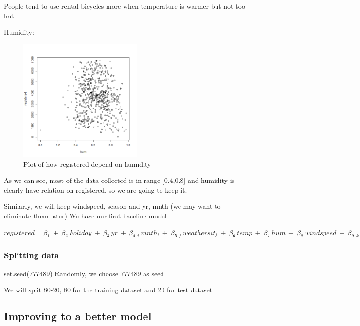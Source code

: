 People tend to use rental bicycles more when temperature is warmer but not too hot. 

Humidity:
\begin{figure}[H]
\centering
\includegraphics[width=0.55\textwidth]{img/plothum.png}
\caption{Plot of how registered depend on humidity}
\label{fig:humidity_on_registered_plot}
\end{figure}

As we can see, most of the data collected is in range [0.4,0.8] and humidity is clearly have relation on registered, so we are going to keep it.

Similarly, we will keep windspeed, season and yr, mnth (we may want to eliminate them later)
We have our first baseline model

\begin{center}
    $registered = \beta_1 \ + \ \beta_2 \ holiday \ + \ \beta_3 \ yr \ + \ \beta_{4,i} \ mnth_i \ + \ \beta_{5,j} \ weathersit_j \ + \ \beta_6 \ temp \ + \ \beta_7 \ hum \ + \ \beta_8 \ windspeed \ + \ \beta_{9,k} \ season_k$
\end{center}

\subsubsection{Splitting data}

 set.seed(777489)
Randomly, we choose 777489 as seed

We will split 80-20, 80 for the training dataset and 20 for test dataset



\subsection{Improving to a better model}

